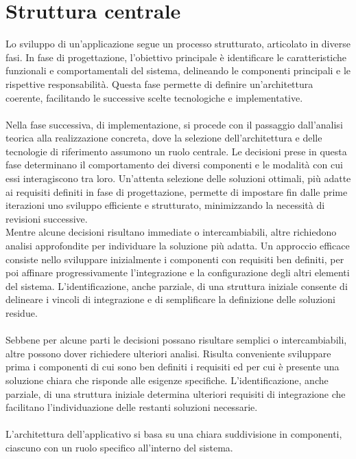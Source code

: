 \section{Struttura centrale}

Lo sviluppo di un’applicazione segue un processo strutturato, articolato in diverse fasi. In fase di progettazione,
l'obiettivo principale è identificare le caratteristiche funzionali e comportamentali del sistema, delineando le componenti principali e le rispettive responsabilità.
Questa fase permette di definire un'architettura coerente, facilitando le successive scelte tecnologiche e implementative.\\
\\
Nella fase successiva, di implementazione, si procede con il passaggio dall’analisi teorica alla realizzazione concreta,
dove la selezione dell’architettura e delle tecnologie di riferimento assumono un ruolo centrale.
Le decisioni prese in questa fase determinano il comportamento dei diversi componenti e le modalità con cui essi interagiscono tra loro.
Un’attenta selezione delle soluzioni ottimali, più adatte ai requisiti definiti in fase di progettazione,
permette di impostare fin dalle prime iterazioni uno sviluppo efficiente e strutturato, minimizzando la necessità di revisioni successive.
\\
Mentre alcune decisioni risultano immediate o intercambiabili, altre richiedono analisi approfondite per individuare la soluzione più adatta.
Un approccio efficace consiste nello sviluppare inizialmente i componenti con requisiti ben definiti,
per poi affinare progressivamente l'integrazione e la configurazione degli altri elementi del sistema.
L'identificazione, anche parziale, di una struttura iniziale consente di delineare i vincoli di integrazione e di semplificare la definizione delle soluzioni residue.\\
\\
Sebbene per alcune parti le decisioni possano risultare semplici o intercambiabili, altre possono dover richiedere ulteriori analisi.
Risulta conveniente sviluppare prima i componenti di cui sono ben definiti i requisiti ed per cui è presente una soluzione chiara che risponde alle esigenze specifiche.
L’identificazione, anche parziale, di una struttura iniziale determina ulteriori requisiti di integrazione che facilitano l’individuazione delle restanti soluzioni necessarie.\\
\\
L’architettura dell’applicativo si basa su una chiara suddivisione in componenti, ciascuno con un ruolo specifico all’interno del sistema.
